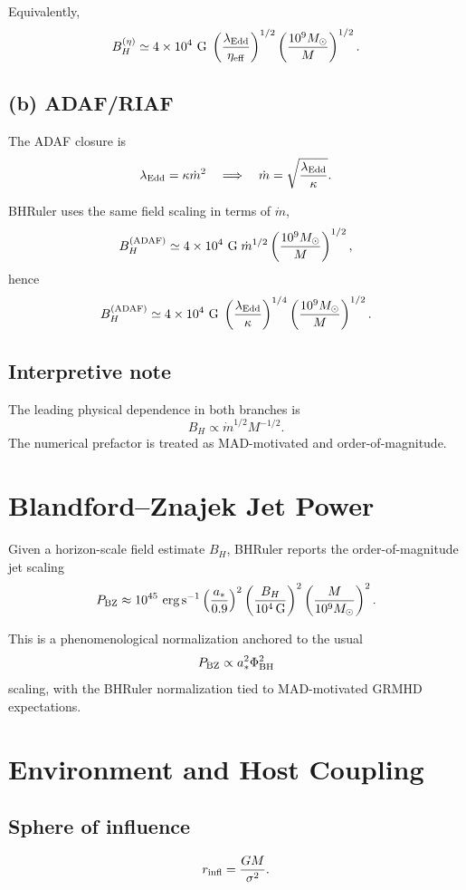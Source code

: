\documentclass[12pt]{article}
\begin{document}
Equivalently,
\[
B_H^{(\eta)} \simeq 4\times10^4\ {\rm G}\;
\left(\frac{\lambda_{\rm Edd}}{\eta_{\rm eff}}\right)^{1/2}
\left(\frac{10^9 M_\odot}{M}\right)^{1/2}.
\]

\subsection*{(b) ADAF/RIAF}
The ADAF closure is
\[
\lambda_{\rm Edd} = \kappa \dot m^2
\quad\Longrightarrow\quad
\dot m = \sqrt{\frac{\lambda_{\rm Edd}}{\kappa}}.
\]

BHRuler uses the same field scaling in terms of $\dot m$,
\[
B_H^{(\rm ADAF)} \simeq 4\times10^4\ {\rm G}\;
\dot m^{1/2}
\left(\frac{10^9 M_\odot}{M}\right)^{1/2},
\]
hence
\[
B_H^{(\rm ADAF)} \simeq 4\times10^4\ {\rm G}\;
\left(\frac{\lambda_{\rm Edd}}{\kappa}\right)^{1/4}
\left(\frac{10^9 M_\odot}{M}\right)^{1/2}.
\]

\subsection*{Interpretive note}
The leading physical dependence in both branches is
\[
B_H \propto \dot m^{1/2} M^{-1/2}.
\]
The numerical prefactor is treated as MAD-motivated and order-of-magnitude.

\section{Blandford--Znajek Jet Power}

Given a horizon-scale field estimate $B_H$, BHRuler reports the order-of-magnitude jet scaling
\[
P_{\rm BZ} \approx 10^{45}\ {\rm erg\,s^{-1}}
\left(\frac{a_*}{0.9}\right)^2
\left(\frac{B_H}{10^4\,{\rm G}}\right)^2
\left(\frac{M}{10^9M_\odot}\right)^2.
\]

This is a phenomenological normalization anchored to the usual
\[
P_{\rm BZ} \propto a_*^2 \Phi_{\rm BH}^2
\]
scaling, with the BHRuler normalization tied to MAD-motivated GRMHD expectations.

\section{Environment and Host Coupling}

\subsection*{Sphere of influence}
\[
r_{\rm infl} = \frac{GM}{\sigma^2}.
\]
\end{document}

